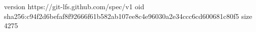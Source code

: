 version https://git-lfs.github.com/spec/v1
oid sha256:c94f2d6befaf8f92666f61b582ab107ee8c4e96030a2e34ccc6cd600681c80f5
size 4275
